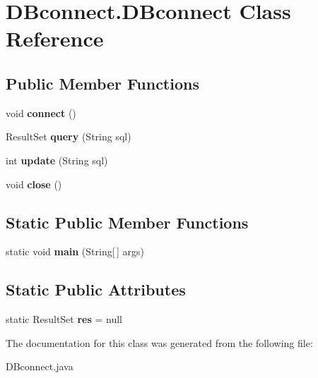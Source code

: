 \hypertarget{class_d_bconnect_1_1_d_bconnect}{}\section{D\+Bconnect.\+D\+Bconnect Class Reference}
\label{class_d_bconnect_1_1_d_bconnect}
\subsection*{Public Member Functions}
\begin{DoxyCompactItemize}
\item 
void {\bfseries connect} ()\hypertarget{class_d_bconnect_1_1_d_bconnect_ad65015a1752e59008591e77363cdea85}{}\label{class_d_bconnect_1_1_d_bconnect_ad65015a1752e59008591e77363cdea85}

\item 
Result\+Set {\bfseries query} (String sql)\hypertarget{class_d_bconnect_1_1_d_bconnect_a57b8b689cdd7c5c8847f1217365770be}{}\label{class_d_bconnect_1_1_d_bconnect_a57b8b689cdd7c5c8847f1217365770be}

\item 
int {\bfseries update} (String sql)\hypertarget{class_d_bconnect_1_1_d_bconnect_a3649fbeed1ca73503f4c4fe64ec6224f}{}\label{class_d_bconnect_1_1_d_bconnect_a3649fbeed1ca73503f4c4fe64ec6224f}

\item 
void {\bfseries close} ()\hypertarget{class_d_bconnect_1_1_d_bconnect_a6036d909edae5c3d94b39e336d0a876e}{}\label{class_d_bconnect_1_1_d_bconnect_a6036d909edae5c3d94b39e336d0a876e}

\end{DoxyCompactItemize}
\subsection*{Static Public Member Functions}
\begin{DoxyCompactItemize}
\item 
static void {\bfseries main} (String\mbox{[}$\,$\mbox{]} args)\hypertarget{class_d_bconnect_1_1_d_bconnect_aad4e1274e0184b62c3e1c3dca1cf3563}{}\label{class_d_bconnect_1_1_d_bconnect_aad4e1274e0184b62c3e1c3dca1cf3563}

\end{DoxyCompactItemize}
\subsection*{Static Public Attributes}
\begin{DoxyCompactItemize}
\item 
static Result\+Set {\bfseries res} = null\hypertarget{class_d_bconnect_1_1_d_bconnect_af39df1d2d107724daeceb6c8585f521a}{}\label{class_d_bconnect_1_1_d_bconnect_af39df1d2d107724daeceb6c8585f521a}

\end{DoxyCompactItemize}


The documentation for this class was generated from the following file\+:\begin{DoxyCompactItemize}
\item 
D\+Bconnect.\+java\end{DoxyCompactItemize}
